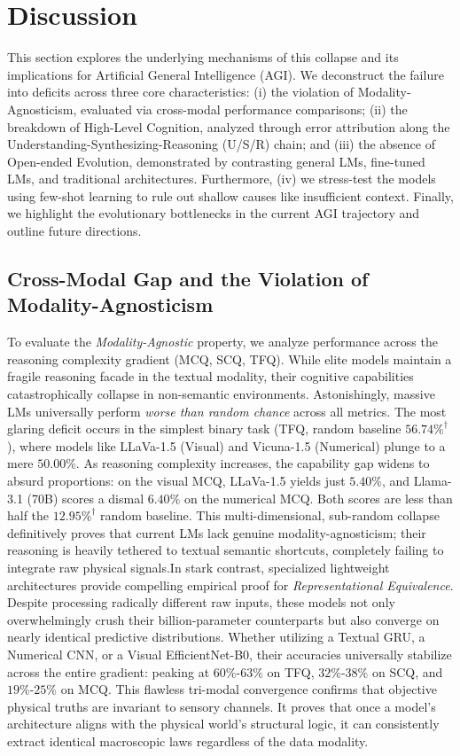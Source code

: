 \section{Discussion}
\label{sec:discussion}

This section explores the underlying mechanisms of this collapse and its implications for Artificial General Intelligence (AGI). We deconstruct the failure into deficits across three core characteristics: (i) the violation of Modality-Agnosticism, evaluated via cross-modal performance comparisons; (ii) the breakdown of High-Level Cognition, analyzed through error attribution along the Understanding-Synthesizing-Reasoning (U/S/R) chain; and (iii) the absence of Open-ended Evolution, demonstrated by contrasting general LMs, fine-tuned LMs, and traditional architectures. Furthermore, (iv) we stress-test the models using few-shot learning to rule out shallow causes like insufficient context. Finally, we highlight the evolutionary bottlenecks in the current AGI trajectory and outline future directions.

\subsection{Cross-Modal Gap and the Violation of Modality-Agnosticism}

To evaluate the \textit{Modality-Agnostic} property, we analyze performance across the reasoning complexity gradient (MCQ, SCQ, TFQ). While elite models maintain a fragile reasoning facade in the textual modality, their cognitive capabilities catastrophically collapse in non-semantic environments. Astonishingly, massive LMs universally perform \textit{worse than random chance} across all metrics. The most glaring deficit occurs in the simplest binary task (TFQ, random baseline $56.74\%^\dagger$), where models like LLaVa-1.5 (Visual) and Vicuna-1.5 (Numerical) plunge to a mere $50.00\%$. As reasoning complexity increases, the capability gap widens to absurd proportions: on the visual MCQ, LLaVa-1.5 yields just $5.40\%$, and Llama-3.1 (70B) scores a dismal $6.40\%$ on the numerical MCQ. Both scores are less than half the $12.95\%^\dagger$ random baseline. This multi-dimensional, sub-random collapse definitively proves that current LMs lack genuine modality-agnosticism; their reasoning is heavily tethered to textual semantic shortcuts, completely failing to integrate raw physical signals.In stark contrast, specialized lightweight architectures provide compelling empirical proof for \textit{Representational Equivalence}. Despite processing radically different raw inputs, these models not only overwhelmingly crush their billion-parameter counterparts but also converge on nearly identical predictive distributions. Whether utilizing a Textual GRU, a Numerical CNN, or a Visual EfficientNet-B0, their accuracies universally stabilize across the entire gradient: peaking at $60\%$-$63\%$ on TFQ, $32\%$-$38\%$ on SCQ, and $19\%$-$25\%$ on MCQ. This flawless tri-modal convergence confirms that objective physical truths are invariant to sensory channels. It proves that once a model's architecture aligns with the physical world's structural logic, it can consistently extract identical macroscopic laws regardless of the data modality.


